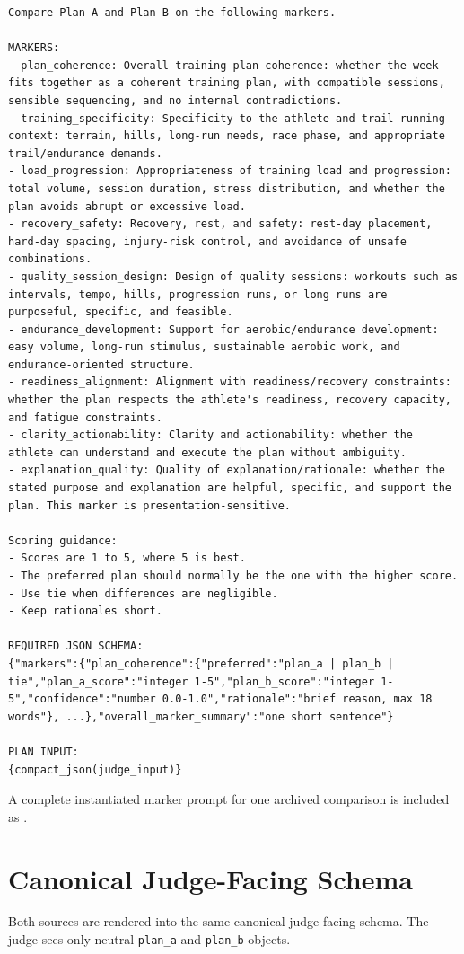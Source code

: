 \documentclass[11pt]{article}
\begin{document}
\begin{lstlisting}
Compare Plan A and Plan B on the following markers.

MARKERS:
- plan_coherence: Overall training-plan coherence: whether the week fits together as a coherent training plan, with compatible sessions, sensible sequencing, and no internal contradictions.
- training_specificity: Specificity to the athlete and trail-running context: terrain, hills, long-run needs, race phase, and appropriate trail/endurance demands.
- load_progression: Appropriateness of training load and progression: total volume, session duration, stress distribution, and whether the plan avoids abrupt or excessive load.
- recovery_safety: Recovery, rest, and safety: rest-day placement, hard-day spacing, injury-risk control, and avoidance of unsafe combinations.
- quality_session_design: Design of quality sessions: workouts such as intervals, tempo, hills, progression runs, or long runs are purposeful, specific, and feasible.
- endurance_development: Support for aerobic/endurance development: easy volume, long-run stimulus, sustainable aerobic work, and endurance-oriented structure.
- readiness_alignment: Alignment with readiness/recovery constraints: whether the plan respects the athlete's readiness, recovery capacity, and fatigue constraints.
- clarity_actionability: Clarity and actionability: whether the athlete can understand and execute the plan without ambiguity.
- explanation_quality: Quality of explanation/rationale: whether the stated purpose and explanation are helpful, specific, and support the plan. This marker is presentation-sensitive.

Scoring guidance:
- Scores are 1 to 5, where 5 is best.
- The preferred plan should normally be the one with the higher score.
- Use tie when differences are negligible.
- Keep rationales short.

REQUIRED JSON SCHEMA:
{"markers":{"plan_coherence":{"preferred":"plan_a | plan_b | tie","plan_a_score":"integer 1-5","plan_b_score":"integer 1-5","confidence":"number 0.0-1.0","rationale":"brief reason, max 18 words"}, ...},"overall_marker_summary":"one short sentence"}

PLAN INPUT:
{compact_json(judge_input)}
\end{lstlisting}
A complete instantiated marker prompt for one archived comparison is included as .

\section{Canonical Judge-Facing Schema}
\label{app:schema}
Both sources are rendered into the same canonical judge-facing schema. The judge sees only neutral \texttt{plan\_a} and \texttt{plan\_b} objects.
\end{document}
